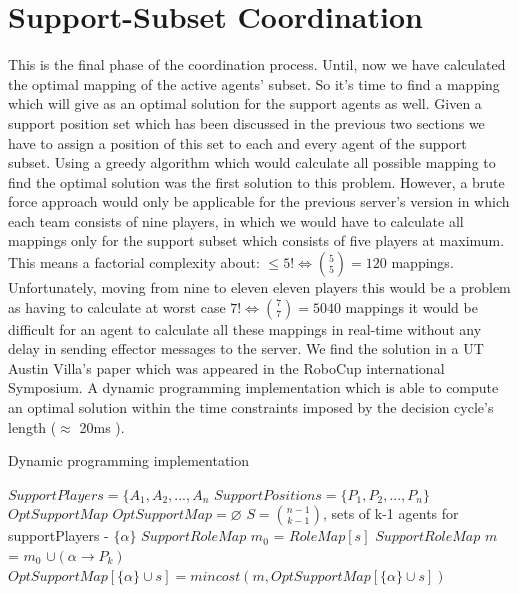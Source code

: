 \section{Support-Subset Coordination}
This is the final phase of the coordination process. Until, now we have calculated the optimal mapping of the active agents' subset. So it's time to find a mapping which will give as an optimal solution for the support agents as well. Given a support position set which has been discussed in the previous two sections we have to assign a position of this set to each and every agent of the support subset. Using a greedy algorithm which would calculate all possible mapping to find the optimal solution was the first solution to this problem. However, a brute force approach would only be applicable for the previous server's version in which each team consists of nine players, in which we would have to calculate all mappings only for the support subset which consists of five players at maximum. This means a factorial complexity about: $\leqslant 5! \Leftrightarrow  {{5}\choose{5}} = 120$ mappings. Unfortunately, moving from nine to eleven eleven players this would be a problem as having to calculate at worst case $ 7! \Leftrightarrow  {{7}\choose{7}} = 5040$ mappings it would be difficult for an agent to calculate all these mappings in real-time without any delay in sending effector messages to the server. We find the solution in a UT Austin Villa's paper \cite{UtAustinVillaPaper} which was appeared in the RoboCup international Symposium. A dynamic programming implementation which is able to compute an optimal solution within the time constraints imposed by the decision cycle's length ($\approx$ 20ms ).
\begin{algorithm}[htb!]
\caption{Dynamic programming implementation \cite{UtAustinVillaPaper}}
\label{alg3}
\begin{algorithmic}[1]
$SupportPlayers = \lbrace A_{1},A_{2},...,A_{n} $
\STATE $SupportPositions = \lbrace P_{1},P_{2},...,P_{n} \rbrace $
$OptSupportMap$
\STATE $OptSupportMap = \varnothing $
\STATE $ S = {{n-1}\choose{k-1}} $, sets of k-1 agents for supportPlayers - $\lbrace \alpha \rbrace$
\STATE $SupportRoleMap$ $m_{0}$ = $RoleMap[s]$
\STATE $SupportRoleMap$ $m$ = $m_{0}$ $ \cup (\alpha \rightarrow P_{k})$
\STATE $OptSupportMap[\lbrace \alpha \rbrace \cup s] = mincost(m,OptSupportMap[\lbrace \alpha \rbrace \cup s])$
\ENDFOR
\ENDFOR
\ENDFOR
\end{algorithmic}
\end{algorithm}

